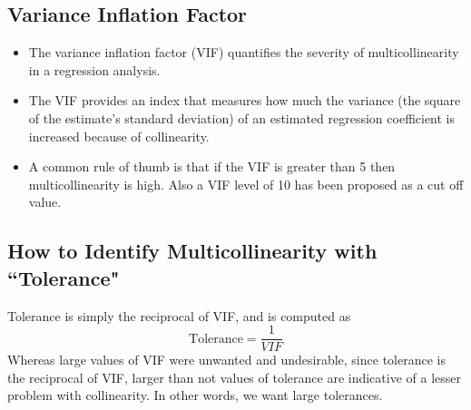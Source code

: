 \documentclass[a4paper,12pt]{article}
\begin{document}
%
%
\subsection{Variance Inflation Factor}
\begin{itemize}
\item The variance inflation factor (VIF) quantifies the severity of multicollinearity in a regression analysis.

\item The VIF provides an index that measures how much the variance (the square of the estimate's standard deviation) of an estimated regression coefficient is increased because of collinearity.


\item A common rule of thumb is that if the VIF is greater than 5 then multicollinearity is high. Also a VIF level of 10 has been proposed as a cut off value.
\end{itemize}






\newpage
\subsection{How to Identify Multicollinearity with ``Tolerance"}

Tolerance is simply the reciprocal of VIF, and is computed as
\[ \mbox{Tolerance} = \frac{1}{VIF}\]
Whereas large values of VIF were unwanted and undesirable, since tolerance is the reciprocal of VIF, larger than not values of tolerance are indicative of a lesser problem with collinearity. In other words, we want large tolerances.
\end{document}
